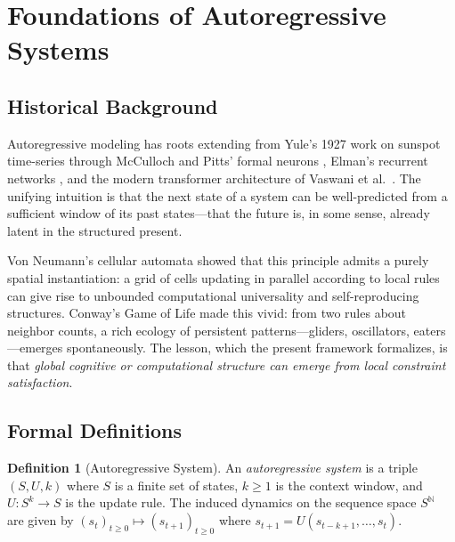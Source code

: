 \documentclass[a4paper,12pt]{article}
\theoremstyle{definition}
\newtheorem{definition}{Definition}[section]
\newcommand{\N}{\mathbb{N}}
\begin{document}
\section{Foundations of Autoregressive Systems}
\label{sec:autoregressive}

\subsection{Historical Background}

Autoregressive modeling has roots extending from Yule's 1927 work on sunspot time-series \cite{Yule1927} through McCulloch and Pitts' formal neurons \cite{Rosenblatt1958}, Elman's recurrent networks \cite{Rumelhart1986}, and the modern transformer architecture of Vaswani et al.\ \cite{Vaswani2017}. The unifying intuition is that the next state of a system can be well-predicted from a sufficient window of its past states—that the future is, in some sense, already latent in the structured present.

Von Neumann's cellular automata \cite{Neumann1966} showed that this principle admits a purely spatial instantiation: a grid of cells updating in parallel according to local rules can give rise to unbounded computational universality and self-reproducing structures. Conway's Game of Life \cite{Conway1970, Gardner1970} made this vivid: from two rules about neighbor counts, a rich ecology of persistent patterns—gliders, oscillators, eaters—emerges spontaneously. The lesson, which the present framework formalizes, is that \emph{global cognitive or computational structure can emerge from local constraint satisfaction}.

\subsection{Formal Definitions}

\begin{definition}[Autoregressive System]
\label{def:ar_system}
An \emph{autoregressive system} is a triple $(S, U, k)$ where $S$ is a finite set of states, $k \geq 1$ is the context window, and $U: S^k \to S$ is the update rule. The induced dynamics on the sequence space $S^{\N}$ are given by $(s_t)_{t \geq 0} \mapsto (s_{t+1})_{t \geq 0}$ where $s_{t+1} = U(s_{t-k+1}, \ldots, s_t)$.
\end{definition}
\end{document}

